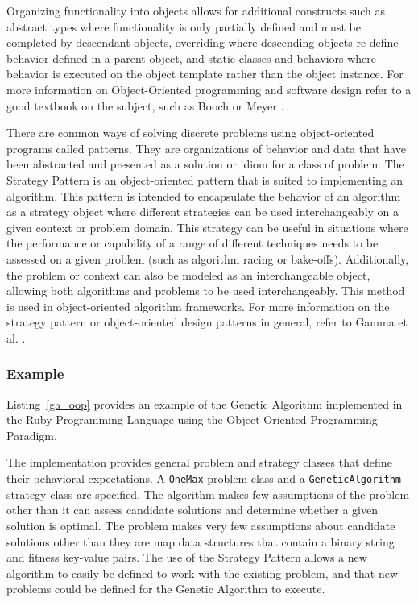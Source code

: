 Organizing functionality into objects allows for additional constructs such as abstract types where functionality is only partially defined and must be completed by descendant objects, overriding where descending objects re-define behavior defined in a parent object, and static classes and behaviors where behavior is executed on the object template rather than the object instance. 
For more information on Object-Oriented programming and software design refer to a good textbook on the subject, such as Booch \cite{Booch1997} or Meyer \cite{Meyer1997}.

There are common ways of solving discrete problems using object-oriented programs called patterns. They are organizations of behavior and data that have been abstracted and presented as a solution or idiom for a class of problem. The Strategy Pattern is an object-oriented pattern that is suited to implementing an algorithm. This pattern is intended to encapsulate the behavior of an algorithm as a strategy object where different strategies can be used interchangeably on a given context or problem domain. This strategy can be useful in situations where the performance or capability of a range of different techniques needs to be assessed on a given problem (such as algorithm racing or bake-offs). Additionally, the problem or context can also be modeled as an interchangeable object, allowing both algorithms and problems to be used interchangeably. This method is used in object-oriented algorithm frameworks.
For more information on the strategy pattern or object-oriented design patterns in general, refer to Gamma et al. \cite{Gamma1995}.

\subsubsection{Example}
Listing~\ref{ga_oop} provides an example of the Genetic Algorithm implemented in the Ruby Programming Language using the Object-Oriented Programming Paradigm. 

The implementation provides general problem and strategy classes that define their behavioral expectations. A \texttt{OneMax} problem class and a \texttt{GeneticAlgorithm} strategy class are specified. The algorithm makes few assumptions of the problem other than it can assess candidate solutions and determine whether a given solution is optimal. The problem makes very few assumptions about candidate solutions other than they are map data structures that contain a binary string and fitness key-value pairs. The use of the Strategy Pattern allows a new algorithm to easily be defined to work with the existing problem, and that new problems could be defined for the Genetic Algorithm to execute.

